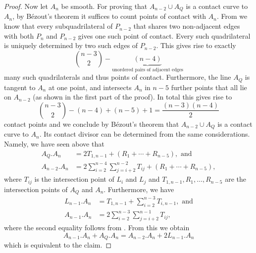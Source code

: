 \documentclass[10pt,a4paper]{amsart}
\begin{document}
\begin{proof}
 Now let $A_n$ be smooth. For proving that  $A_{n-2} \cup A_Q$ is a contact curve to $A_n$, by B\'{e}zout's theorem it suffices to count points of contact with $A_n$. From  we know that every subquadrilateral of $P_{n-2}$ that shares two non-adjacent edges with both $P_n$ and $P_{n-2}$ gives one such point of contact. Every such quadrilateral is uniquely determined by two such edges of $P_{n-2}$. This gives rise to exactly
 \begin{equation*}
     \binom{n-3}{2} - \underbrace{(n-4)}_\textrm{unordered pairs of adjacent edges}
 \end{equation*}
 many such quadrilaterals and thus points of contact.
 Furthermore, the line $A_Q$ is tangent to $A_n$ at one point, and intersects $A_n$ in $n-5$ further points that all lie on $A_{n-2}$ (as shown in the first part of the proof). In total this gives rise to
 \begin{equation*}
     \binom{n-3}{2} - (n-4) + (n-5) + 1 = \frac{(n-3)(n-4)}{2}
 \end{equation*}
 contact points and we conclude by B\'{e}zout's theorem that $A_{n-2} \cup A_Q$ is a contact curve to $A_n$. Its contact divisor can be determined from the same considerations. 
 Namely, we have seen above that
 \begin{align*}
     A_Q.A_n&=2T_{1,n-1}+(R_1+\cdots+R_{n-5}),\textrm{ and}\\
     A_{n-2}.A_n&=2\sum_{i=2}^{n-4}\sum_{j=i+2}^{n-2} T_{ij}+(R_1+\cdots+R_{n-5}),
 \end{align*}
 where $T_{ij}$ is the intersection point of $L_i$ and $L_j$ and $T_{1,n-1},R_1,\ldots,R_{n-5}$ are the intersection points of $A_Q$ and $A_n$. Furthermore, we have
 \begin{align*}
     L_{n-1}.A_n&=T_{1,n-1}+\sum_{i=2}^{n-3}T_{i,n-1},\textrm{ and}\\
     A_{n-1}.A_n&=2\sum_{i=2}^{n-3}\sum_{j=i+2}^{n-1}T_{ij},
 \end{align*}
 where the second equality follows from . From this we obtain
 \begin{equation*}
     A_{n-1}.A_n+A_Q.A_n=A_{n-2}.A_n+2L_{n-1}.A_n
 \end{equation*}
 which is equivalent to the claim.
\end{proof}
\end{document}
